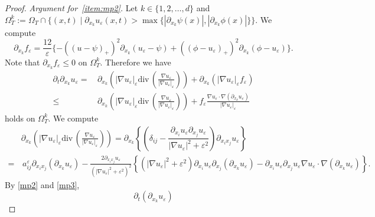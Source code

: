 \documentclass{amsart}
\theoremstyle{definition}
\newcommand{\divergence}{\mathrm{div}\,}
\begin{document}
\begin{proof}
\emph{Argument for~\eqref{item:mp2}.} Let $k \in \{1,2,\dots,d\}$ and
$\Omega _T ^k := \Omega _T \cap \{(x,t) \mid \partial_{x_k} u_\varepsilon (x,t) > \max\{ |\partial _{x_k} \psi (x)|, |\partial _{x_k} \phi (x)| \} \}$.
We compute
\[
\partial_{x_k} f_\varepsilon 
= \frac{12}{\varepsilon}
\{
- ((u-\psi)_+) ^2 \partial _{x_k}( u_\varepsilon - \psi )
+
((\phi - u_\varepsilon)_+) ^2 \partial _{x_k}( \phi -u_\varepsilon)
\}.
\]
Note that $\partial_{x_k} f_\varepsilon  \leq 0$ on $\Omega_ T ^k$.
Therefore we have
\begin{equation}\label{mp2}
\begin{split}
\partial_t \partial_{x_k} u_\varepsilon
= & \,
\partial _{x_k} \left( 
|\nabla u_\varepsilon|_\varepsilon \divergence \left( \frac{\nabla u_\varepsilon}{|\nabla u_\varepsilon|_\varepsilon} \right)
\right)
+ \partial_{x_k} (|\nabla u_\varepsilon |_\varepsilon f_\varepsilon )\\
\leq & \,  
\partial _{x_k} \left( 
|\nabla u_\varepsilon|_\varepsilon
\divergence \left( \frac{\nabla u_\varepsilon}{|\nabla u_\varepsilon|_\varepsilon} \right)
\right)
+  
f_\varepsilon
\frac{\nabla u_\varepsilon \cdot \nabla 
(\partial_{x_k} u_\varepsilon) }{|\nabla u_\varepsilon |_\varepsilon} 
\end{split}
\end{equation}
holds on $\Omega_T ^k$. 
We compute
\begin{equation}\label{mp3}
    \begin{split}
    &\partial _{x_k} \left( 
    |\nabla u_\varepsilon|_\varepsilon    \divergence \left( \frac{\nabla u_\varepsilon}{|\nabla u_\varepsilon|_\varepsilon} \right)
    \right)
    =
    \partial _{x_k}
    \left\{
    \left(
    \delta_{ij} - \dfrac{\partial_{x_i} u_\varepsilon \partial_{x_j} u_\varepsilon}{|\nabla u_\varepsilon |^2 +\varepsilon ^2}
    \right)
    \partial_{x_i x_j} u_\varepsilon
    \right\}\\
    = & \, 
    a_{ij} ^\varepsilon \partial_{x_i x_j } (\partial_{x_k} u_\varepsilon)
    -\frac{2 \partial_{x_i x_j} u_\varepsilon}{(|\nabla u_\varepsilon|^2 +\varepsilon^2)^2}
    \left\{
    (|\nabla u_\varepsilon|^2 +\varepsilon^2)
    \partial_{x_i} u_\varepsilon \partial_{x_j} (\partial_{x_k} u_\varepsilon)
    - \partial_{x_i} u_\varepsilon \partial_{x_j} u_\varepsilon \nabla u_\varepsilon \cdot 
    \nabla (\partial_{x_k} u_\varepsilon)
    \right\}.
    \end{split}
\end{equation}
By \eqref{mp2} and \eqref{mp3}, 
\[
\partial_t (\partial_{x_k} u_\varepsilon)
\]
\end{proof}
\end{document}
